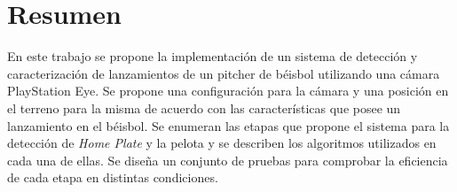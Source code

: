 \chapter*{Resumen}\label{chapter:abstract}

En este trabajo se propone la implementación de un sistema de detección y caracterización de lanzamientos de un pitcher de béisbol utilizando una cámara PlayStation Eye. Se propone una configuración para la cámara y una posición en el terreno para la misma de acuerdo con las características que posee un lanzamiento en el béisbol. Se enumeran las etapas que propone el sistema para la detección de \textit{Home Plate} y la pelota y se describen los algoritmos utilizados en cada una de ellas. Se diseña un conjunto de pruebas para comprobar la eficiencia de cada etapa en distintas condiciones.
